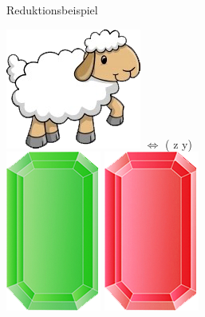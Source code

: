 \documentclass[18pt]{beamer}
\begin{document}
\begin{frame}{Reduktionsbeispiel}
	
\includegraphics[scale=1,7]{Pictures/lamb_white_wom}\thinspace \thinspace   
\thinspace \thinspace \thinspace \thinspace \thinspace \thinspace $\Leftrightarrow$ \thinspace \thinspace \thinspace \thinspace \thinspace \thinspace ( z y)  
\\[0.3cm]
\includegraphics[scale=0.5]{Pictures/gem_green}
\includegraphics[scale=0.5]{Pictures/gem_red}
\end{frame}
\end{document}
